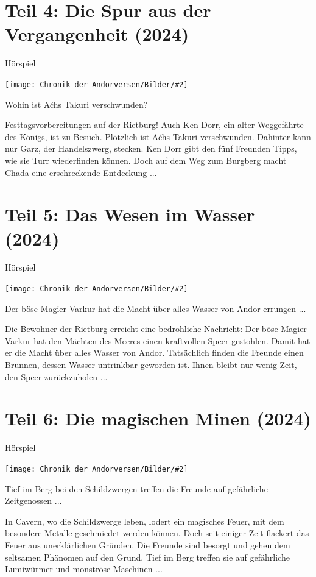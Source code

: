 \documentclass[10pt, a4paper, oneside]{book}
\newcommand{\fillbreak}{\vspace*{\fill}\columnbreak}
\newcommand{\produkt}[1]{%
    \section{#1}%
    \label{Produkt: #1}%
}
\newcommand{\bildmitts}[2][height=0.32\textwidth,width=0.48\textwidth,keepaspectratio]{%
    \begin{center}
        \texttt{[image: Chronik der Andorversen/Bilder/\#2]}
    \end{center}
}
\begin{document}
\begin{multicols}{2}

\produkt{Teil 4: Die Spur aus der Vergangenheit (2024)}

\begin{center}
    Hörspiel
\end{center}

\bildmitts{Die Spur aus der Vergangenheit (2024).jpeg}

Wohin ist Aćhs Takuri verschwunden?

Festtagsvorbereitungen auf der Rietburg! Auch Ken Dorr, ein alter Weggefährte des Königs, ist zu Besuch. Plötzlich ist Aćhs Takuri verschwunden. Dahinter kann nur Garz, der Handelszwerg, stecken. Ken Dorr gibt den fünf Freunden Tipps, wie sie Turr wiederfinden können. Doch auf dem Weg zum Burgberg macht Chada eine erschreckende Entdeckung ...




\fillbreak
\produkt{Teil 5: Das Wesen im Wasser (2024)}

\begin{center}
    Hörspiel
\end{center}

\bildmitts{Das Wesen im Wasser (2024).jpeg}

Der böse Magier Varkur hat die Macht über alles Wasser von Andor errungen ...

Die Bewohner der Rietburg erreicht eine bedrohliche Nachricht: Der böse Magier Varkur hat den Mächten des Meeres einen kraftvollen Speer gestohlen. Damit hat er die Macht über alles Wasser von Andor. Tatsächlich finden die Freunde einen Brunnen, dessen Wasser untrinkbar geworden ist. Ihnen bleibt nur wenig Zeit, den Speer zurückzuholen ...




\fillbreak
\produkt{Teil 6: Die magischen Minen (2024)}

\begin{center}
    Hörspiel
\end{center}

\bildmitts{Die magischen Minen (2024).jpeg}


Tief im Berg bei den Schildzwergen treffen die Freunde auf gefährliche Zeitgenossen ...

In Cavern, wo die Schildzwerge leben, lodert ein magisches Feuer, mit dem besondere Metalle geschmiedet werden können. Doch seit einiger Zeit flackert das Feuer aus unerklärlichen Gründen. Die Freunde sind besorgt und gehen dem seltsamen Phänomen auf den Grund. Tief im Berg treffen sie auf gefährliche Lumiwürmer und monströse Maschinen ...



\end{multicols}
\end{document}
